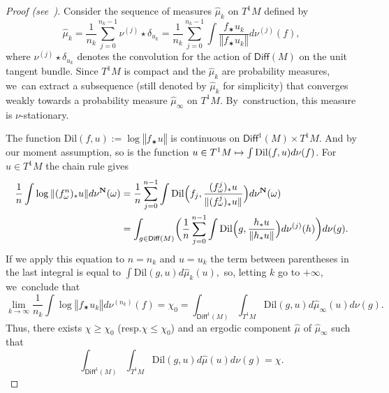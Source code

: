 \documentclass[11pt]{article}
\newcommand{\resp}{resp.\xspace}
\newcommand\mto{\mathchoice{\longmapsto}{\mapsto}{\mapsto}{\mapsto}}
\newcommand{\norm}[1]{{\left\Vert#1\right\Vert}}
\newcommand{\anorm}[1]{{\Vert#1\Vert}}
\newcommand{\lrpar}[1]{\left(#1\right)}
\newcommand{\Blrpar}[1]{\Bigl(#1\Bigr)}
\newcommand{\bblrpar}[1]{\biggl(#1\biggr)}
\def\N{\mathbf{N}}
\newcommand{\dil}{{\mathrm{Dil}}}
\newcommand\Diff{{\mathsf{Diff}}}
\theoremstyle{plain}
\theoremstyle{definition}
\numberwithin{equation}{section}
\begin{document}
\begin{proof}[Proof (see~\cite{chung, hurtado:burnside})]
Consider the
sequence of measures $\hat\mu_k$ on $T^1M$ defined by
\begin{equation*}
\hat\mu_k=\frac{1}{n_k} \sum_{j=0}^{n_k-1} \nu^{(j)}\star \delta_{u_k} =\frac{1}{n_k} \sum_{j=0}^{n_k-1}\int \frac{f_\varstar u_k}{\norm{f_\varstar u_k}} d\nu^{(j)}(f),
\end{equation*}
where $\nu^{(j)}\star \delta_{u_k}$ denotes the convolution for the action of $\Diff(M)$ on the unit tangent bundle. Since $T^1M$ is compact and the
$\hat\mu_k$ are probability measures, we~can extract a subsequence (still denoted by $\hat\mu_k$ for simplicity) that converges weakly towards a
probability measure $\hat\mu_\infty$ on $T^1M$. By~construction, this measure is $\nu$-stationary.

The function $\dil(f, u):=\log\norm{f_\varstar u}$ is continuous on
$\Diff^1(M)\times T^1M$. And by our moment assumption, so is the function
$u\in T^1M \mto \int \dil(f, u) d\nu(f)$.
For $ u\in T^1M$ the chain rule gives
\begin{align*}\notag
\frac{1}{n} \int \log\norm{(f^n_\omega)_\varstar u} d\nu^{\N}(\omega) & = \frac{1}{n} \sum_{j=0}^{n-1} \int \dil\Blrpar{f_j, \frac{(f^j_\omega)_\varstar u}{\anorm{(f^j_\omega)_\varstar u}}} d\nu^{\N}(\omega) \\
& = \int_{g\in \Diff(M)} \bblrpar{\frac{1}{n} \sum_{j=0}^{n-1} \int \dil\Blrpar{g, \frac{h_\varstar u}{\norm{h_\varstar u}}} d\nu^{(j)}(h) } d\nu(g).
\end{align*}
If we apply this equation to $n=n_k$ and $u=u_k$ the term between parentheses in
the last integral is equal to
$
\int \dil\lrpar{g,u} d\hat\mu_k(u),
$
so, letting $k$ go to $+\infty$, we~conclude that
\begin{equation*}
\lim_{k\to\infty} \frac{1}{n_k} \int \log \norm{f_\varstar u_k} d\nu^{(n_k)}(f) = \chi_0=
\int_{\Diff^1(M)}\int_{T^1M} \dil(g,u) d\hat\mu_\infty(u) d\nu(g).
\end{equation*}
Thus, there exists $\chi\geq \chi_0$ (\resp $\chi\leq \chi_0$) and
an ergodic component $\hat\mu$ of $\hat\mu_\infty$
such that
\begin{equation*}
\int_{\Diff^1(M)}\int_{T^1M} \dil(g,u) d\hat\mu (u) d\nu(g) = \chi.
\end{equation*}


\end{proof}
\end{document}
